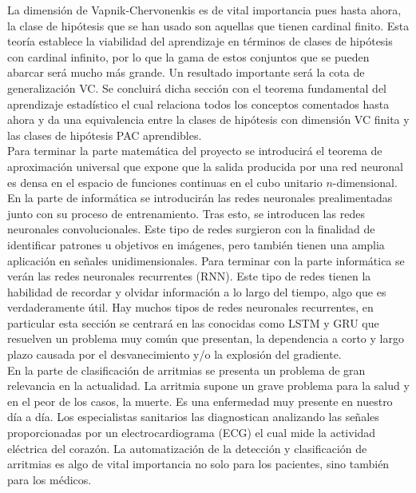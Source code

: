     La dimensión de Vapnik-Chervonenkis es de vital importancia pues hasta ahora, la clase de hipótesis que se han usado son aquellas que tienen cardinal finito. Esta teoría establece la viabilidad del aprendizaje en términos de clases de hipótesis con cardinal infinito, por lo que la gama de estos conjuntos que se pueden abarcar será mucho más grande. Un resultado importante será la cota de generalización VC. Se concluirá dicha sección con el teorema fundamental del aprendizaje estadístico el cual relaciona todos los conceptos comentados hasta ahora y da una equivalencia entre la clases de hipótesis con dimensión VC finita y las clases de hipótesis PAC aprendibles. \\

    Para terminar la parte matemática del proyecto se introducirá el teorema de aproximación universal que expone que la salida producida por una red neuronal es densa en el espacio de funciones continuas en el cubo unitario $n$-dimensional.  \\


    En la parte de informática se introducirán las redes neuronales prealimentadas junto con su proceso de entrenamiento. Tras esto, se introducen las redes neuronales convolucionales. Este tipo de redes surgieron con la finalidad de identificar patrones u objetivos en imágenes, pero también tienen una amplia aplicación en señales unidimensionales. Para terminar con la parte informática se verán las redes neuronales recurrentes (RNN). Este tipo de redes tienen la habilidad de recordar y olvidar información a lo largo del tiempo, algo que es verdaderamente útil. Hay muchos tipos de redes neuronales recurrentes, en particular esta sección se centrará en las conocidas como LSTM y GRU que resuelven un problema muy común que presentan, la dependencia a corto y largo plazo causada por el desvanecimiento y/o la explosión del gradiente.  \\
    
    En la parte de clasificación de arritmias se presenta un problema de gran relevancia en la actualidad. La arritmia supone un grave problema para la salud y en el peor de los casos, la muerte. Es una enfermedad muy presente en nuestro día a día. Los especialistas sanitarios las diagnostican analizando las señales proporcionadas por un electrocardiograma (ECG) el cual mide la actividad eléctrica del corazón. La automatización de la detección y clasificación de arritmias es algo de vital importancia no solo para los pacientes, sino también para los médicos.\\
    
